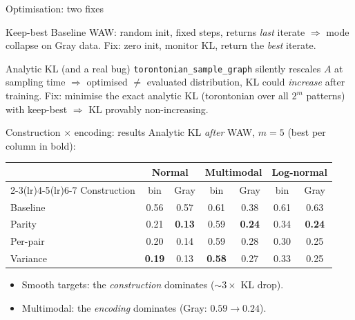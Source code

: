 \documentclass[10pt,aspectratio=169]{beamer}
\begin{document}
\begin{frame}{Optimisation: two fixes}
\begin{block}{Keep-best}
Baseline WAW: random init, fixed steps, returns \emph{last} iterate $\Rightarrow$
mode collapse on Gray data. Fix: zero init, monitor KL, return the
\emph{best} iterate.
\end{block}
\begin{block}{Analytic KL (and a real bug)}
\texttt{torontonian\_sample\_graph} \alert{silently rescales $A$} at sampling
time $\Rightarrow$ optimised $\neq$ evaluated distribution, KL could
\emph{increase} after training. Fix: minimise the exact analytic KL (torontonian
over all $2^m$ patterns) with keep-best $\Rightarrow$ KL provably non-increasing.
\end{block}
\end{frame}

\begin{frame}{Construction $\times$ encoding: results}
Analytic KL \emph{after} WAW, $m=5$ (best per column in bold):
\begin{center}
\begin{tabular}{lcccccc}
\toprule
 & \multicolumn{2}{c}{Normal} & \multicolumn{2}{c}{Multimodal} & \multicolumn{2}{c}{Log-normal}\\
\cmidrule(lr){2-3}\cmidrule(lr){4-5}\cmidrule(lr){6-7}
Construction & bin & Gray & bin & Gray & bin & Gray\\
\midrule
Baseline   & 0.56 & 0.57 & 0.61 & 0.38 & 0.61 & 0.63\\
Parity     & 0.21 & \textbf{0.13} & 0.59 & \textbf{0.24} & 0.34 & \textbf{0.24}\\
Per-pair   & 0.20 & 0.14 & 0.59 & 0.28 & 0.30 & 0.25\\
Variance   & \textbf{0.19} & 0.13 & \textbf{0.58} & 0.27 & 0.33 & 0.25\\
\bottomrule
\end{tabular}
\end{center}
\begin{itemize}
  \item Smooth targets: the \emph{construction} dominates ($\sim3\times$ KL drop).
  \item Multimodal: the \emph{encoding} dominates (Gray: $0.59\to0.24$).
\end{itemize}
\end{frame}
\end{document}
